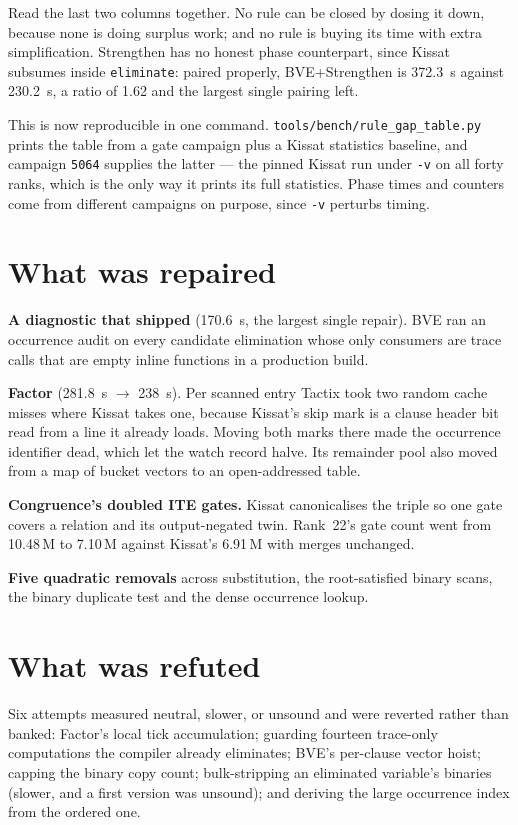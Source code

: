 \documentclass[11pt]{article}
\newcommand{\code}[1]{\texttt{#1}}
\begin{document}
Read the last two columns together. No rule can be closed by dosing it down,
because none is doing surplus work; and no rule is buying its time with extra
simplification. Strengthen has no honest phase counterpart, since Kissat
subsumes inside \code{eliminate}: paired properly, BVE+Strengthen is 372.3~s
against 230.2~s, a ratio of 1.62 and the largest single pairing left.

This is now reproducible in one command. \code{tools/bench/rule\_gap\_table.py}
prints the table from a gate campaign plus a Kissat statistics baseline, and
campaign \code{5064} supplies the latter --- the pinned Kissat run under
\code{-v} on all forty ranks, which is the only way it prints its full
statistics. Phase times and counters come from different campaigns on purpose,
since \code{-v} perturbs timing.

\section{What was repaired}

\textbf{A diagnostic that shipped} (170.6~s, the largest single repair). BVE
ran an occurrence audit on every candidate elimination whose only consumers
are trace calls that are empty inline functions in a production build.

\textbf{Factor} (281.8~s $\to$ 238~s). Per scanned entry Tactix took two random
cache misses where Kissat takes one, because Kissat's skip mark is a clause
header bit read from a line it already loads. Moving both marks there made the
occurrence identifier dead, which let the watch record halve. Its remainder
pool also moved from a map of bucket vectors to an open-addressed table.

\textbf{Congruence's doubled ITE gates.} Kissat canonicalises the triple so one
gate covers a relation and its output-negated twin. Rank~22's gate count went
from 10.48\,M to 7.10\,M against Kissat's 6.91\,M with merges unchanged.

\textbf{Five quadratic removals} across substitution, the root-satisfied binary
scans, the binary duplicate test and the dense occurrence lookup.

\section{What was refuted}

Six attempts measured neutral, slower, or unsound and were reverted rather than
banked: Factor's local tick accumulation; guarding fourteen trace-only
computations the compiler already eliminates; BVE's per-clause vector hoist;
capping the binary copy count; bulk-stripping an eliminated variable's binaries
(slower, and a first version was unsound); and deriving the large occurrence
index from the ordered one.
\end{document}
